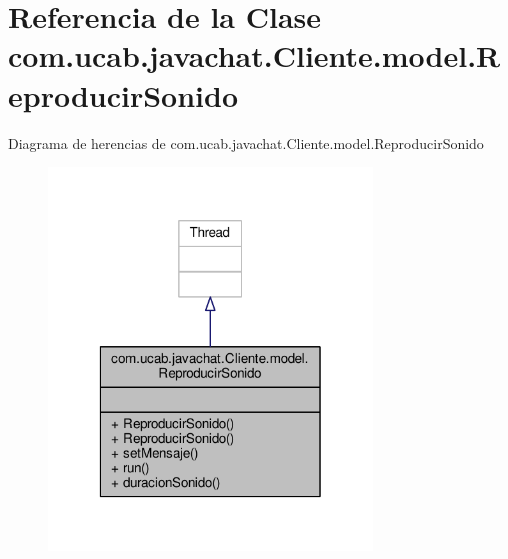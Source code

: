 \hypertarget{classcom_1_1ucab_1_1javachat_1_1_cliente_1_1model_1_1_reproducir_sonido}{\section{Referencia de la Clase com.\-ucab.\-javachat.\-Cliente.\-model.\-Reproducir\-Sonido}
\label{classcom_1_1ucab_1_1javachat_1_1_cliente_1_1model_1_1_reproducir_sonido}
}


Diagrama de herencias de com.\-ucab.\-javachat.\-Cliente.\-model.\-Reproducir\-Sonido\nopagebreak
\begin{figure}[H]
\begin{center}
\leavevmode
\includegraphics[width=244pt]{classcom_1_1ucab_1_1javachat_1_1_cliente_1_1model_1_1_reproducir_sonido__inherit__graph}
\end{center}
\end{figure}


